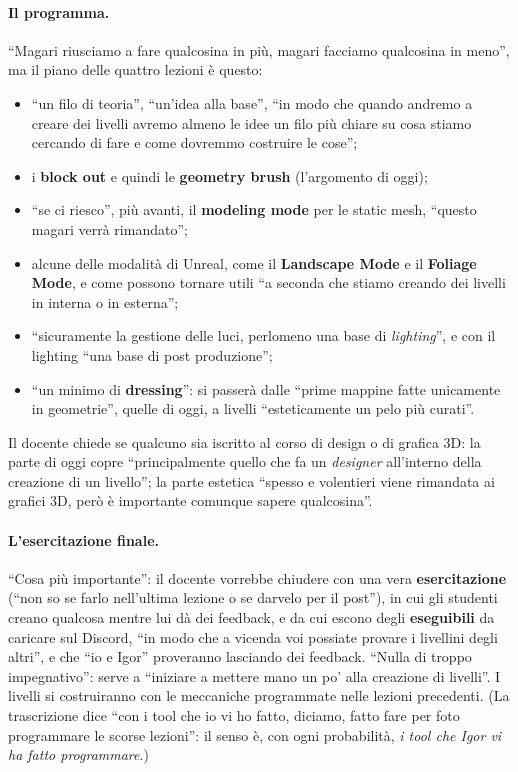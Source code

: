 \paragraph{Il programma.} ``Magari riusciamo a fare qualcosina in più, magari facciamo
qualcosina in meno'', ma il piano delle quattro lezioni è questo:
\begin{itemize}
  \item ``un filo di teoria'', ``un'idea alla base'', ``in modo che quando andremo a creare
        dei livelli avremo almeno le idee un filo più chiare su cosa stiamo cercando di
        fare e come dovremmo costruire le cose'';
  \item i \textbf{block out} e quindi le \textbf{geometry brush} (l'argomento di oggi);
  \item ``se ci riesco'', più avanti, il \textbf{modeling mode} per le static mesh,
        ``questo magari verrà rimandato'';
  \item alcune delle modalità di Unreal, come il \textbf{Landscape Mode} e il
        \textbf{Foliage Mode}, e come possono tornare utili ``a seconda che stiamo creando
        dei livelli in interna o in esterna'';
  \item ``sicuramente la gestione delle luci, perlomeno una base di \emph{lighting}'', e
        con il lighting ``una base di post produzione'';
  \item ``un minimo di \textbf{dressing}'': si passerà dalle ``prime mappine fatte
        unicamente in geometrie'', quelle di oggi, a livelli ``esteticamente un pelo più
        curati''.
\end{itemize}
Il docente chiede se qualcuno sia iscritto al corso di design o di grafica 3D: la parte di
oggi copre ``principalmente quello che fa un \emph{designer} all'interno della creazione di
un livello''; la parte estetica ``spesso e volentieri viene rimandata ai grafici 3D, però è
importante comunque sapere qualcosina''.

\paragraph{L'esercitazione finale.} ``Cosa più importante'': il docente vorrebbe chiudere
con una vera \textbf{esercitazione} (``non so se farlo nell'ultima lezione o se darvelo per
il post''), in cui gli studenti creano qualcosa mentre lui dà dei feedback, e da cui escono
degli \textbf{eseguibili} da caricare sul Discord, ``in modo che a vicenda voi possiate
provare i livellini degli altri'', e che ``io e Igor'' proveranno lasciando dei feedback.
``Nulla di troppo impegnativo'': serve a ``iniziare a mettere mano un po' alla creazione di
livelli''. I livelli si costruiranno con le meccaniche programmate nelle lezioni
precedenti. (La trascrizione dice ``con i tool che io vi ho fatto, diciamo, fatto fare per
foto programmare le scorse lezioni'': il senso è, con ogni probabilità, \emph{i tool che
Igor vi ha fatto programmare}.)


